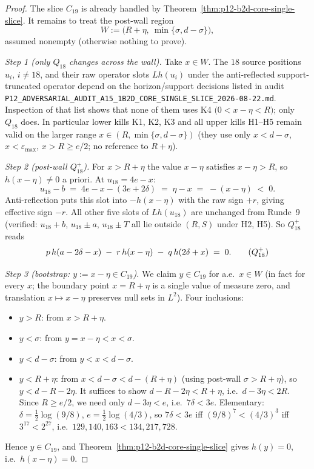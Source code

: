 \begin{proof}
The slice $C_{19}$ is already handled by
Theorem~\ref{thm:p12-b2d-core-single-slice}.  It remains to treat the
post-wall region
\[
W := \bigl(R + \eta,\ \min\{\sigma, d - \sigma\}\bigr),
\]
assumed nonempty (otherwise nothing to prove).

\smallskip
\noindent\emph{Step 1 (only $Q_{18}$ changes across the wall).}
Take $x \in W$.  The $18$ source positions
$u_{i}$, $i \ne 18$, and their raw operator slots
$L h(u_{i})$ under the anti-reflected support-truncated operator
depend on the horizon/support decisions listed in
audit \texttt{P12\_ADVERSARIAL\_AUDIT\_A15\_1B2D\_CORE\_SINGLE\_SLICE\_2026-08-22.md}.
Inspection of that list shows that none of them uses K4
$\bigl(0 < x - \eta < R\bigr)$; only $Q_{18}$ does.  In particular
lower kills K1, K2, K3 and all upper kills H1--H5 remain valid on
the larger range $x \in (R, \min\{\sigma, d - \sigma\})$ (they use
only $x < d - \sigma$, $x < \varepsilon_{\max}$, $x > R \ge e/2$;
no reference to $R + \eta$).

\smallskip
\noindent\emph{Step 2 (post-wall $Q_{18}^{+}$).}
For $x > R + \eta$ the value $x - \eta$ satisfies $x - \eta > R$,
so $h(x - \eta) \ne 0$ a priori.  At $u_{18} = 4e - x$:
\[
u_{18} - b \;=\; 4e - x - (3e + 2\delta)
\;=\; \eta - x \;=\; -(x - \eta) \;<\; 0.
\]
Anti-reflection puts this slot into $-h(x - \eta)$ with the raw sign
$+r$, giving effective sign $-r$.  All other five slots of $L h(u_{18})$
are unchanged from Runde~9 (verified: $u_{18} + b$, $u_{18} \pm a$,
$u_{18} \pm T$ all lie outside $(R, S)$ under H2, H5).  So $Q_{18}^{+}$
reads
\[
p\, h(a - 2\delta - x) \;-\; r\, h(x - \eta) \;-\; q\, h(2\delta + x) \;=\; 0.
\tag{$Q_{18}^{+}$}
\]

\smallskip
\noindent\emph{Step 3 (bootstrap: $y := x - \eta \in C_{19}$).}
We claim $y \in C_{19}$ for a.e.\ $x \in W$ (in fact for every $x$;
the boundary point $x = R + \eta$ is a single value of measure zero,
and translation $x \mapsto x - \eta$ preserves null sets in $L^{2}$).
Four inclusions:
\begin{itemize}
\item $y > R$: from $x > R + \eta$.
\item $y < \sigma$: from $y = x - \eta < x < \sigma$.
\item $y < d - \sigma$: from $y < x < d - \sigma$.
\item $y < R + \eta$: from $x < d - \sigma < d - (R + \eta)$
  (using post-wall $\sigma > R + \eta$), so
  $y < d - R - 2\eta$.  It suffices to show
  $d - R - 2\eta < R + \eta$, i.e.\ $d - 3\eta < 2R$.  Since
  $R \ge e/2$, we need only $d - 3\eta < e$, i.e.\ $7\delta < 3e$.
  Elementary: $\delta = \tfrac12 \log(9/8)$, $e = \tfrac12 \log(4/3)$,
  so $7\delta < 3e$ iff $(9/8)^{7} < (4/3)^{3}$ iff $3^{17} < 2^{27}$,
  i.e.\ $129{,}140{,}163 < 134{,}217{,}728$.
\end{itemize}
Hence $y \in C_{19}$, and
Theorem~\ref{thm:p12-b2d-core-single-slice} gives $h(y) = 0$, i.e.\
$h(x - \eta) = 0$.


\end{proof}
